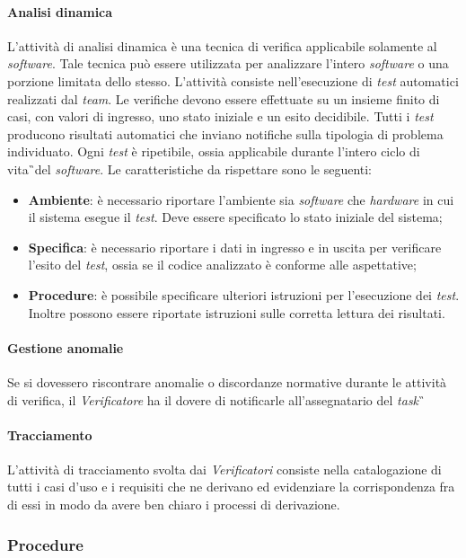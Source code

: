 \paragraph{Analisi dinamica}
L'attività di analisi dinamica è una tecnica di verifica applicabile solamente al \textit{software}. Tale tecnica può essere utilizzata per analizzare l'intero \textit{software} o una porzione limitata dello stesso. L'attività consiste nell'esecuzione di \textit{test} automatici realizzati dal \textit{team}. Le verifiche devono essere effettuate su un insieme finito di casi, con valori di ingresso, uno stato iniziale e un esito decidibile. Tutti i \textit{test} producono risultati automatici che inviano notifiche sulla tipologia di problema individuato. Ogni \textit{test} è ripetibile, ossia applicabile durante l'intero ciclo di vita\G\ del \textit{software}. Le caratteristiche da rispettare sono le seguenti: 
\begin{itemize}
	\item \textbf{Ambiente}: è necessario riportare l'ambiente sia \textit{software} che \textit{hardware} in cui il sistema esegue il \textit{test}. Deve essere specificato lo stato iniziale del sistema; 
	\item \textbf{Specifica}: è necessario riportare i dati in ingresso e in uscita per verificare l'esito del \textit{test}, ossia se il codice analizzato è conforme alle aspettative;
	\item \textbf{Procedure}: è possibile specificare ulteriori istruzioni per l'esecuzione dei \textit{test}. Inoltre possono essere riportate istruzioni sulle corretta lettura dei risultati.
\end{itemize}
\paragraph{Gestione anomalie}
Se si dovessero riscontrare anomalie o discordanze normative durante le attività di verifica, il \textit{Verificatore} ha il dovere di notificarle all'assegnatario del \textit{task}\G\  

\paragraph{Tracciamento}
L'attività di tracciamento svolta dai \textit{Verificatori} consiste nella catalogazione di tutti i casi d'uso e i requisiti che ne derivano ed evidenziare la corrispondenza fra di essi in modo da avere ben chiaro i processi di derivazione.

\subsubsection{Procedure}
